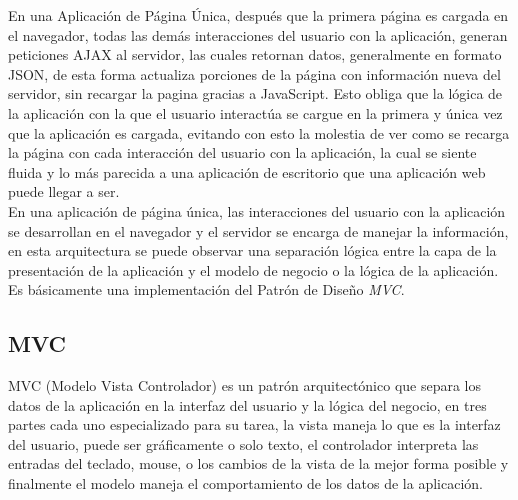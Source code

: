 En una Aplicación de Página Única, después que la primera página es cargada en el navegador, todas las demás interacciones del usuario con la aplicación, generan peticiones AJAX al servidor, las cuales retornan datos, generalmente en formato JSON, de esta forma actualiza porciones de la página con información nueva del servidor, sin recargar la pagina gracias a JavaScript. Esto obliga que la lógica de la aplicación con la que el usuario interactúa se cargue en la primera y única vez que la aplicación es cargada, evitando con esto la molestia de ver como se recarga la página con cada interacción del usuario con la aplicación, la cual se siente fluida y lo más parecida a una aplicación de escritorio que una aplicación web puede llegar a ser.\\





%

En una aplicación de página única, las interacciones del usuario con la aplicación se desarrollan en el navegador y el servidor se encarga de manejar la información, en esta arquitectura se puede observar una separación lógica entre la capa de la presentación de la aplicación y el modelo de negocio o la lógica de la aplicación. Es básicamente una implementación del Patrón de Diseño \emph{MVC}.\\


\subsection{MVC} %
\label{sub:mvc}
  MVC (Modelo Vista  Controlador) es un patrón arquitectónico que separa
  los datos de la aplicación en la interfaz del usuario y  la lógica del
  negocio, en tres partes cada uno especializado para su tarea, la vista
  maneja lo que es la interfaz del usuario, puede ser gráficamente o solo texto,
  el controlador interpreta las entradas del teclado, mouse, o los cambios
  de la vista de la mejor forma posible y finalmente el modelo maneja el comportamiento
  de los datos de la aplicación.\cite{web7}\\

